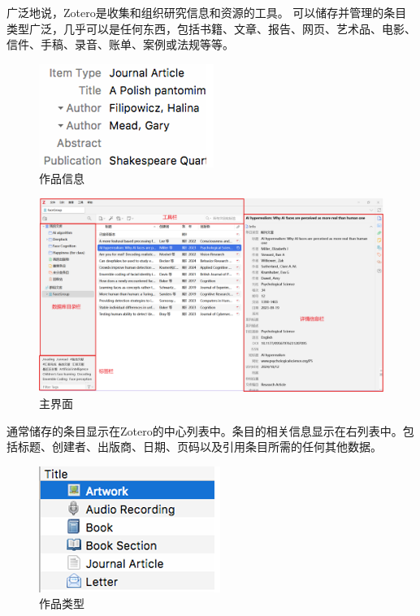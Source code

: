 \documentclass[]{ctexbook}
\theoremstyle{definition}
\theoremstyle{definition}
\theoremstyle{definition}
\theoremstyle{definition}
\theoremstyle{remark}
\begin{document}
广泛地说，Zotero是收集和组织研究信息和资源的工具。
可以储存并管理的条目类型广泛，几乎可以是任何东西，包括书籍、文章、报告、网页、艺术品、电影、信件、手稿、录音、账单、案例或法规等等。

\begin{figure}

{\centering \includegraphics[width=0.4\linewidth]{img/zotero/zotero_workInform} 

}

\caption{作品信息}\label{fig:zotero-workInform}
\end{figure}

\begin{figure}

{\centering \includegraphics[width=1\linewidth]{img/zotero/zotero_interface} 

}

\caption{主界面}\label{fig:zotero-interface}
\end{figure}

通常储存的条目显示在Zotero的中心列表中。条目的相关信息显示在右列表中。包括标题、创建者、出版商、日期、页码以及引用条目所需的任何其他数据。

\begin{figure}

{\centering \includegraphics[width=0.4\linewidth]{img/zotero/zotero_worktype} 

}

\caption{作品类型}\label{fig:zotero-worktype}
\end{figure}
\end{document}
